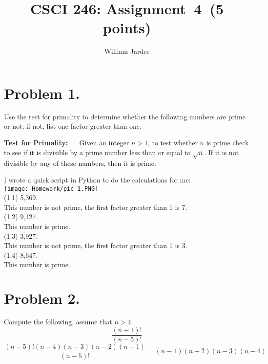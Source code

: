 \documentclass[11pt]{article}
\begin{document}
\date{}

\title{CSCI 246: Assignment~4~(5 points)}

\author{William Jardee}

\maketitle
\section*{Problem 1.}

\noindent
Use the test for primality to determine whether the following numbers are
prime or not; if not, list one factor greater than one.

{\bf Test for Primality:} ~~ Given an integer $n>1$, to test whether $n$ is
prime check to see if it is divisible by a prime number less than or equal to
$\sqrt{n}$. If it is not divisible by any of these numbers, then it is prime.
\newline

I wrote a quick script in Python to do the calculations for me:\\
\texttt{[image: Homework/pic\_1.PNG]}\\

\noindent
(1.1) 5,369.\\
This number is not prime, the first factor greater than 1 is 7.\\

\noindent
(1.2) 9,127.\\
This number is prime.\\

\noindent
(1.3) 3,927.\\
This number is not prime, the first factor greater than 1 is 3.\\

\noindent
(1.4) 8,647.\\
This number is prime.\\

\newpage


\section*{Problem 2.}

\noindent
Compute the following, assume that $n>4$.
$$\frac{(n-1)!}{(n-5)!}$$
\newline 
\[\frac{(n-5)!(n-4)(n-3)(n-2)(n-1)}{(n-5)!} = (n-1)(n-2)(n-3)(n-4)\]
\end{document}
